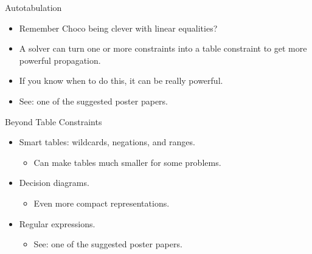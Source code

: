 \documentclass{beamer}
\begin{document}
\begin{frame}{Autotabulation}
    \begin{itemize}
        \item Remember Choco being clever with linear equalities?
        \item A solver can turn one or more constraints into a table constraint
            to get more powerful propagation.
        \item If you know when to do this, it can be really powerful.
        \item See: one of the suggested poster papers.
    \end{itemize}
\end{frame}

\begin{frame}{Beyond Table Constraints}
    \begin{itemize}
        \item Smart tables: wildcards, negations, and ranges.
            \begin{itemize}
                \item Can make tables much smaller for some problems.
            \end{itemize}
        \item Decision diagrams.
            \begin{itemize}
                \item Even more compact representations.
            \end{itemize}
        \item Regular expressions.
            \begin{itemize}
                \item See: one of the suggested poster papers.
            \end{itemize}
    \end{itemize}
\end{frame}
\end{document}
